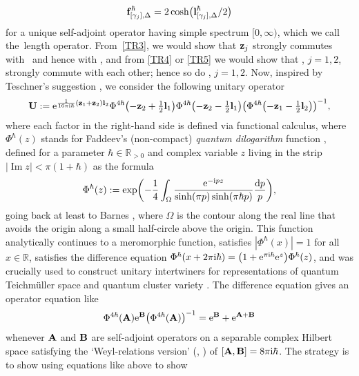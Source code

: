 \documentclass[pdftex]{sigma}
\numberwithin{equation}{section}
\theoremstyle{definition}
\begin{document}
\[
{\bf f}^\hbar_{[\gamma_j],\Delta} = 2\cosh\bigl({\bf l}^\hbar_{[\gamma_j],\Delta}/2\bigr)
\]
for a unique self-adjoint operator  having simple spectrum $[0,\infty)$, which we call the~length ope\-rator. From~\ref{TR3}, we would show that ${\bf z}_j$ strongly commutes with~ and hence with , and from \ref{TR4} or \ref{TR5} we would show that , $j=1,2$, strongly commute with each other; hence so do , $j=1,2$.
Now, inspired by Teschner's suggestion \cite[equation~(15.11)]{T}, we consider the following unitary operator
\begin{align*}
{\bf U} :=
{\rm e}^{ \frac{1}{16\pi {\rm i} \hbar} ({\bf z}_1 + {\bf z}_2) {\bf l}_2}
\Phi^{4\hbar} \bigl(-{\bf z}_2 + \tfrac{1}{2} {\bf l}_1\bigr)
\Phi^{4\hbar}\bigl(-{\bf z}_2 - \tfrac{1}{2} {\bf l}_1\bigr)
\bigl(\Phi^{4\hbar}\bigl(- {\bf z}_1 - \tfrac{1}{2} {\bf l}_2\bigr)\bigr)^{-1},
\end{align*}
where each factor in the right-hand side is defined via functional calculus, where $\Phi^\hbar(z)$ stands for Faddeev's (non-compact) {\it quantum dilogarithm} function \cite{F95, FK94}, defined for a parameter $\hbar \in \mathbb{R}_{>0}$ and complex variable $z$ living in the strip $|{\operatorname{Im} z}| < \pi(1+\hbar)$ as the formula
\[
\Phi^\hbar(z) := \exp\biggl( - \frac{1}{4} \int_\Omega \frac{{\rm e}^{-{\rm i} pz}}{\sinh(\pi p) \sinh(\pi \hbar p)} \frac{{\rm d}p}{p} \biggr),
\]
going back at least to Barnes \cite{B01}, where $\Omega$ is the contour along the real line that avoids the origin along a small half-circle above the origin. This function analytically continues to a meromorphic function, satisfies $|\Phi^\hbar(x)|=1$ for all $x\in \mathbb{R}$, satisfies the difference equation $\Phi^\hbar(x+2\pi {\rm i} \hbar) = \bigl(1+{\rm e}^{\pi {\rm i} \hbar} {\rm e}^z\bigr) \Phi^\hbar(z)$, and was crucially used to construct unitary intertwiners for representations of quantum Teichm\"uller space \cite{CF, Kash98} and quantum cluster variety \cite{FG09}.
The difference equation gives an operator equation like
\begin{align*}
\Phi^{4\hbar}({\bf A}) {\rm e}^{{\bf B}} \bigl(\Phi^{4 \hbar}({\bf A})\bigr)^{-1} = {\rm e}^{{\bf B}} + {\rm e}^{{\bf A} + {\bf B}}
\end{align*}
whenever ${\bf A}$ and ${\bf B}$ are self-adjoint operators on a separable complex Hilbert space satisfying the `Weyl-relations version' (\cite[Definition~14.2]{Hall}, \cite[Definition~3.5]{Kim_phase}) of $[{\bf A}, {\bf B}] = 8 \pi {\rm i} \hbar$. The strategy is to show using equations like above to show
\end{document}
